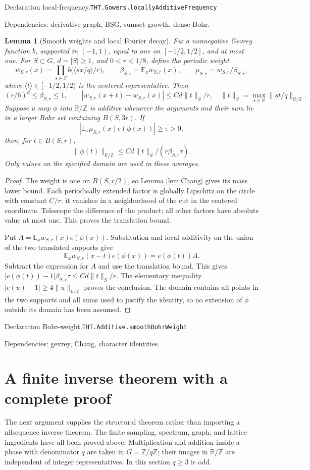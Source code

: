 \documentclass[11pt]{article}
\newtheorem{lemma}[theorem]{Lemma}
\theoremstyle{definition}
\newcommand{\R}{\mathbb R}
\newcommand{\Z}{\mathbb Z}
\newcommand{\E}{\mathbb E}
\numberwithin{equation}{section}
\newcommand{\bp}[3]{\par\smallskip\begingroup\footnotesize
\noindent\hypertarget{bp:#1}{\textsf{Declaration #1.}}\quad\nolinkurl{#2}\par
\noindent\textsf{Dependencies:} #3.\par\endgroup\smallskip}
\begin{document}
\bp{local-frequency}{THT.Gowers.locallyAdditiveFrequency}{derivative-graph, BSG, sumset-growth, dense-Bohr}

\begin{lemma}[Smooth weights and local Fourier decay]\label{lem:Bohr-weight}
Fix a nonnegative Gevrey function $b$, supported in $(-1,1)$, equal to one on $[-1/2,1/2]$, and at most one. For $S\subset G$, $d=|S|\ge1$, and $0<r<1/8$, define the periodic weight
\[
 w_{S,r}(x)=\prod_{s\in S} b\bigl(\langle sx/q\rangle/r\bigr),\qquad
 \beta_{S,r}=\E_xw_{S,r}(x),\qquad \mu_{S,r}=w_{S,r}/\beta_{S,r},
\]
where $\langle t\rangle\in[-1/2,1/2)$ is the centered representative. Then
\[
 (r/6)^d\le\beta_{S,r}\le1,\qquad
 |w_{S,r}(x+t)-w_{S,r}(x)|\le C d\|t\|_S/r,
 \quad \|t\|_S=\max_{s\in S}\|st/q\|_{\R/\Z}.
\]
Suppose a map $\phi$ into $\R/\Z$ is additive whenever the arguments and their sum lie in a larger Bohr set containing $B(S,3r)$. If
\[
 \left|\E_x\mu_{S,r}(x)e(\phi(x))\right|\ge\tau>0,
\]
then, for $t\in B(S,r)$,
\[
 \|\phi(t)\|_{\R/\Z}\le C d\|t\|_S/(r\beta_{S,r}\tau).
\]
Only values on the specified domain are used in these averages.
\end{lemma}
\begin{proof}
The weight is one on $B(S,r/2)$, so Lemma \ref{lem:Chang} gives its mass lower bound. Each periodically extended factor is globally Lipschitz on the circle with constant $C/r$: it vanishes in a neighborhood of the cut in the centered coordinate. Telescope the difference of the product; all other factors have absolute value at most one. This proves the translation bound.

Put $A=\E_xw_{S,r}(x)e(\phi(x))$. Substitution and local additivity on the union of the two translated supports give
\[
 \E_xw_{S,r}(x-t)e(\phi(x))=e(\phi(t))A.
\]
Subtract the expression for $A$ and use the translation bound. This gives $|e(\phi(t))-1|\beta_{S,r}\tau\le Cd\|t\|_S/r$. The elementary inequality $|e(u)-1|\ge4\|u\|_{\R/\Z}$ proves the conclusion. The domain contains all points in the two supports and all sums used to justify the identity, so no extension of $\phi$ outside its domain has been assumed.
\end{proof}
\bp{Bohr-weight}{THT.Additive.smoothBohrWeight}{gevrey, Chang, character identities}


\section{A finite inverse theorem with a complete proof}\label{sec:finite-inverse}
The next argument supplies the structural theorem rather than importing a nilsequence inverse theorem. The finite sampling, spectrum, graph, and lattice ingredients have all been proved above. Multiplication and addition inside a phase with denominator $q$ are taken in $G=\Z/q\Z$; their images in $\R/\Z$ are independent of integer representatives. In this section $q\ge3$ is odd.
\end{document}
